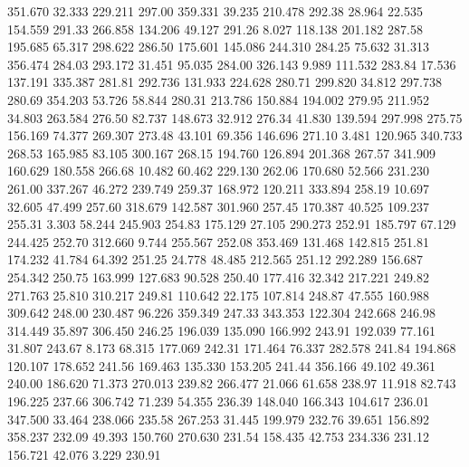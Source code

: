  351.670   32.333  229.211       297.00
 359.331   39.235  210.478       292.38
  28.964   22.535  154.559       291.33
 266.858  134.206   49.127       291.26
   8.027  118.138  201.182       287.58
 195.685   65.317  298.622       286.50
 175.601  145.086  244.310       284.25
  75.632   31.313  356.474       284.03
 293.172   31.451   95.035       284.00
 326.143    9.989  111.532       283.84
  17.536  137.191  335.387       281.81
 292.736  131.933  224.628       280.71
 299.820   34.812  297.738       280.69
 354.203   53.726   58.844       280.31
 213.786  150.884  194.002       279.95
 211.952   34.803  263.584       276.50
  82.737  148.673   32.912       276.34
  41.830  139.594  297.998       275.75
 156.169   74.377  269.307       273.48
  43.101   69.356  146.696       271.10
   3.481  120.965  340.733       268.53
 165.985   83.105  300.167       268.15
 194.760  126.894  201.368       267.57
 341.909  160.629  180.558       266.68
  10.482   60.462  229.130       262.06
 170.680   52.566  231.230       261.00
 337.267   46.272  239.749       259.37
 168.972  120.211  333.894       258.19
  10.697   32.605   47.499       257.60
 318.679  142.587  301.960       257.45
 170.387   40.525  109.237       255.31
   3.303   58.244  245.903       254.83
 175.129   27.105  290.273       252.91
 185.797   67.129  244.425       252.70
 312.660    9.744  255.567       252.08
 353.469  131.468  142.815       251.81
 174.232   41.784   64.392       251.25
  24.778   48.485  212.565       251.12
 292.289  156.687  254.342       250.75
 163.999  127.683   90.528       250.40
 177.416   32.342  217.221       249.82
 271.763   25.810  310.217       249.81
 110.642   22.175  107.814       248.87
  47.555  160.988  309.642       248.00
 230.487   96.226  359.349       247.33
 343.353  122.304  242.668       246.98
 314.449   35.897  306.450       246.25
 196.039  135.090  166.992       243.91
 192.039   77.161   31.807       243.67
   8.173   68.315  177.069       242.31
 171.464   76.337  282.578       241.84
 194.868  120.107  178.652       241.56
 169.463  135.330  153.205       241.44
 356.166   49.102   49.361       240.00
 186.620   71.373  270.013       239.82
 266.477   21.066   61.658       238.97
  11.918   82.743  196.225       237.66
 306.742   71.239   54.355       236.39
 148.040  166.343  104.617       236.01
 347.500   33.464  238.066       235.58
 267.253   31.445  199.979       232.76
  39.651  156.892  358.237       232.09
  49.393  150.760  270.630       231.54
 158.435   42.753  234.336       231.12
 156.721   42.076    3.229       230.91
